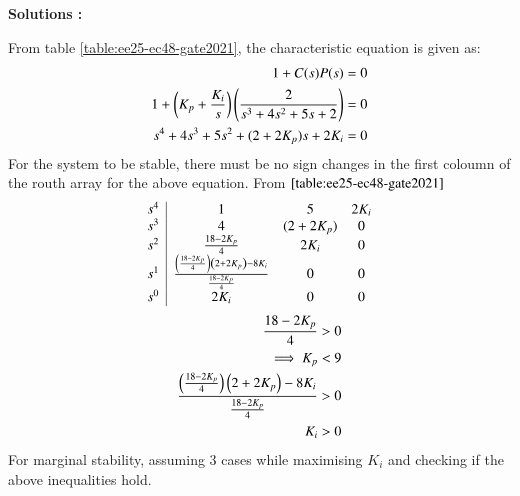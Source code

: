 \documentclass[journal,12pt,onecolumn]{IEEEtran}
\theoremstyle{remark}
\begin{document}
\textbf{Solutions :}
    
    From table \ref{table:ee25-ec48-gate2021}, the characteristic equation is given as:
    \begin{align}
        1+C(s)P(s) &= 0\\
        1+\left(K_p+\frac{K_i}{s}\right)\left(\frac{2}{s^3+4s^2+5s+2}\right) &= 0\\
        s^4+4s^3+5s^2+(2+2K_p)s+2K_i &=0
    \end{align}
    For the system to be stable, there must be no sign changes in the first coloumn of the routh array for the above equation. From $\ref{table:ee25-ec48-gate2021}$
    \begin{align}
    \begin{array}{c|cccc}
        s^4 & 1 & 5 & 2K_i \\
        s^3 & 4 & (2 + 2K_p) & 0 \\
        s^2 & \frac{18-2K_p}{4} & 2K_i & 0 \\
        s^1 &  \frac{\left(\frac{18-2K_p}{4}\right)\left(2 + 2K_p\right)-8K_i}{\frac{18-2K_p}{4}} & 0 & 0\\
        s^0 & 2K_i &0 &0 \\
        \end{array}\\
        \end{align}
        \begin{align}
            \frac{18-2K_p}{4} &> 0\\
            \implies K_p &< 9 \label{eq:gate 2021 eq:1}\\
            \frac{\left(\frac{18-2K_p}{4}\right)\left(2 + 2K_p\right)-8K_i}{\frac{18-2K_p}{4}} &> 0\label{eq:gate 2021 eq:2}\\
        K_i &>0 \label{eq:gate 2021 eq:3}
    \end{align}
    For marginal stability, assuming 3 cases while maximising $K_i$ and checking if the above inequalities hold.
\end{document}
